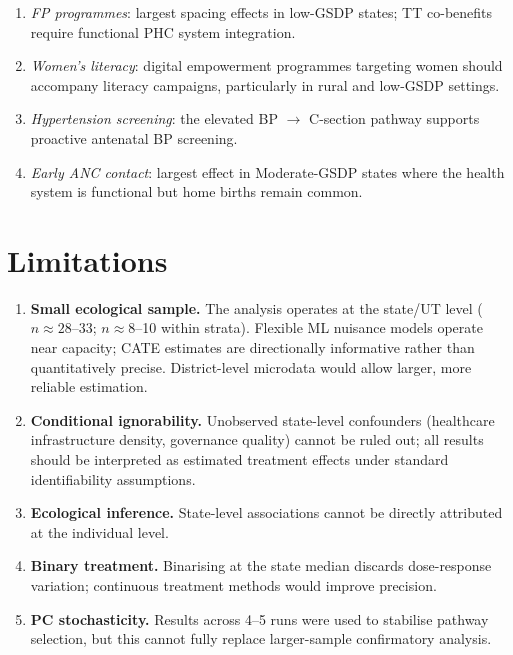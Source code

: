 \documentclass[12pt,a4paper]{report}
\begin{document}
\begin{enumerate}[label=(\roman*),leftmargin=*,itemsep=4pt]
\item \textit{FP programmes}: largest spacing effects in low-GSDP states; TT
  co-benefits require functional PHC system integration.
\item \textit{Women's literacy}: digital empowerment programmes targeting women
  should accompany literacy campaigns, particularly in rural and low-GSDP settings.
\item \textit{Hypertension screening}: the elevated BP $\to$ C-section pathway
  supports proactive antenatal BP screening.
\item \textit{Early ANC contact}: largest effect in Moderate-GSDP states where the
  health system is functional but home births remain common.
\end{enumerate}

\chapter{Limitations}
\label{chap:limitations}

\begin{enumerate}[leftmargin=*,itemsep=6pt]
\item \textbf{Small ecological sample.}
  The analysis operates at the state/UT level ($n\approx28$--33;
  $n\approx8$--10 within strata). Flexible ML nuisance models operate near
  capacity; CATE estimates are directionally informative rather than quantitatively
  precise. District-level microdata would allow larger, more reliable estimation.
\item \textbf{Conditional ignorability.}
  Unobserved state-level confounders (healthcare infrastructure density, governance
  quality) cannot be ruled out; all results should be interpreted as estimated
  treatment effects under standard identifiability assumptions.
\item \textbf{Ecological inference.}
  State-level associations cannot be directly attributed at the individual level.
\item \textbf{Binary treatment.}
  Binarising at the state median discards dose-response variation; continuous
  treatment methods would improve precision.
\item \textbf{PC stochasticity.}
  Results across 4--5 runs were used to stabilise pathway selection, but this
  cannot fully replace larger-sample confirmatory analysis.
\end{enumerate}
\end{document}
